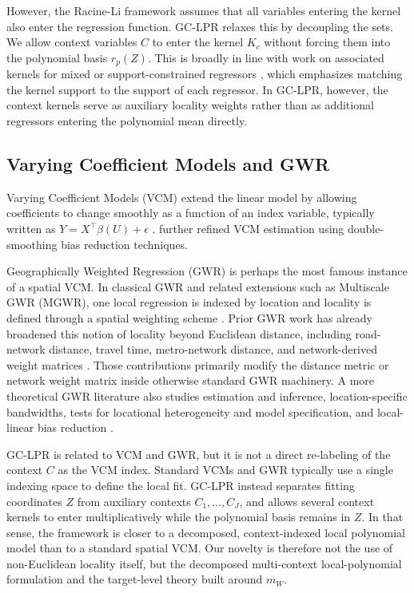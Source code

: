 \documentclass[final,1p,times,authoryear]{elsarticle}
\begin{document}
However, the Racine-Li framework assumes that all variables entering the kernel also enter the regression function. GC-LPR relaxes this by decoupling the sets. We allow context variables $C$ to enter the kernel $K_c$ without forcing them into the polynomial basis $r_p(Z)$. This is broadly in line with work on associated kernels for mixed or support-constrained regressors \citep{some2016effects}, which emphasizes matching the kernel support to the support of each regressor. In GC-LPR, however, the context kernels serve as auxiliary locality weights rather than as additional regressors entering the polynomial mean directly.

\subsection{Varying Coefficient Models and GWR}
Varying Coefficient Models (VCM) extend the linear model by allowing coefficients to change smoothly as a function of an index variable, typically written as $Y = X^\top \beta(U) + \epsilon$ \citep{hastie1993varying, fan1999statistical}. \citet{he2009double} further refined VCM estimation using double-smoothing bias reduction techniques.

Geographically Weighted Regression (GWR) \citep{brunsdon1996geographically, fotheringham2003geographically} is perhaps the most famous instance of a spatial VCM. In classical GWR and related extensions such as Multiscale GWR (MGWR), one local regression is indexed by location and locality is defined through a spatial weighting scheme \citep{fotheringham2017multiscale}. Prior GWR work has already broadened this notion of locality beyond Euclidean distance, including road-network distance, travel time, metro-network distance, and network-derived weight matrices \citep{lu2011non_euclidean_gwr,lu2014non_euclidean_gwr,gao2022network_distance_gwr,he2023network_weight_gwr}. Those contributions primarily modify the distance metric or network weight matrix inside otherwise standard GWR machinery. A more theoretical GWR literature also studies estimation and inference, location-specific bandwidths, tests for locational heterogeneity and model specification, and local-linear bias reduction \citep{paez2002gwr_part1,paez2002gwr_part2,wang2008local_linear_gwr}. 

GC-LPR is related to VCM and GWR, but it is not a direct re-labeling of the context $C$ as the VCM index. Standard VCMs and GWR typically use a single indexing space to define the local fit. GC-LPR instead separates fitting coordinates $Z$ from auxiliary contexts $C_1,\ldots,C_J$, and allows several context kernels to enter multiplicatively while the polynomial basis remains in $Z$. In that sense, the framework is closer to a decomposed, context-indexed local polynomial model than to a standard spatial VCM. Our novelty is therefore not the use of non-Euclidean locality itself, but the decomposed multi-context local-polynomial formulation and the target-level theory built around $m_W$.
\end{document}

